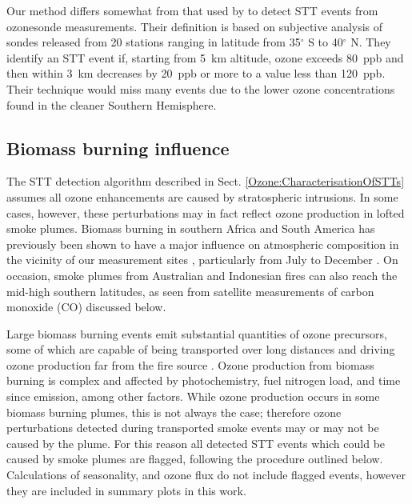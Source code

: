     Our method differs somewhat from that used by \textcite{Tang2010} to detect STT events from ozonesonde measurements. 
    Their definition is based on subjective analysis of sondes released from 20 stations ranging in latitude from 35$^\circ$ S to 40$^\circ$ N.
    They identify an STT event if, starting from 5~km altitude, ozone exceeds 80~ppb and then within 3~km decreases by 20~ppb or more to a value less than 120~ppb.
    Their technique would miss many events due to the lower ozone concentrations found in the cleaner Southern Hemisphere.
  
  \subsection{Biomass burning influence}
    \label{Ozone:BiomassBurning}
    The STT detection algorithm described in Sect. \ref{Ozone:CharacterisationOfSTTs} assumes all ozone enhancements are caused by stratospheric intrusions.
    In some cases, however, these perturbations may in fact reflect ozone production in lofted smoke plumes.
    Biomass burning in southern Africa and South America has previously been shown to have a major influence on atmospheric composition in the vicinity of our measurement sites \parencite{Oltmans2001, Gloudemans2006, Edwards2006}, particularly from July to December \parencite{Pak2003, Liu2017}.
    On occasion, smoke plumes from Australian and Indonesian fires can also reach the mid-high southern latitudes, as seen from satellite measurements of carbon monoxide (CO) discussed below. %
    
    Large biomass burning events emit substantial quantities of ozone precursors, some of which are capable of being transported over long distances and driving ozone production far from the fire source \parencite{Jaffe2012}.
    Ozone production from biomass burning is complex and affected by photochemistry, fuel nitrogen load, and time since emission, among other factors. 
    While ozone production occurs in some biomass burning plumes, this is not always the case; therefore ozone perturbations detected during transported smoke events may or may not be caused by the plume.
    For this reason all detected STT events which could be caused by smoke plumes are flagged, following the procedure outlined below.
    Calculations of seasonality, and ozone flux do not include flagged events, however they are included in summary plots in this work.
    
